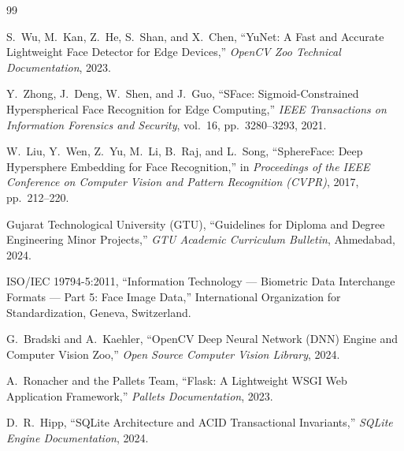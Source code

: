\documentclass[12pt,a4paper,oneside]{report}
\begin{document}
\clearpage
\begin{thebibliography}{99}

S.~Wu, M.~Kan, Z.~He, S.~Shan, and X.~Chen,
``YuNet: A Fast and Accurate Lightweight Face Detector for Edge Devices,''
\emph{OpenCV Zoo Technical Documentation}, 2023.

Y.~Zhong, J.~Deng, W.~Shen, and J.~Guo,
``SFace: Sigmoid-Constrained Hyperspherical Face Recognition for Edge Computing,''
\emph{IEEE Transactions on Information Forensics and Security}, vol.~16, pp.~3280--3293, 2021.

W.~Liu, Y.~Wen, Z.~Yu, M.~Li, B.~Raj, and L.~Song,
``SphereFace: Deep Hypersphere Embedding for Face Recognition,''
in \emph{Proceedings of the IEEE Conference on Computer Vision and Pattern Recognition (CVPR)}, 2017, pp.~212--220.

Gujarat Technological University (GTU),
``Guidelines for Diploma and Degree Engineering Minor Projects,''
\emph{GTU Academic Curriculum Bulletin}, Ahmedabad, 2024.

ISO/IEC 19794-5:2011,
``Information Technology --- Biometric Data Interchange Formats --- Part 5: Face Image Data,''
International Organization for Standardization, Geneva, Switzerland.

G.~Bradski and A.~Kaehler,
``OpenCV Deep Neural Network (DNN) Engine and Computer Vision Zoo,''
\emph{Open Source Computer Vision Library}, 2024.

A.~Ronacher and the Pallets Team,
``Flask: A Lightweight WSGI Web Application Framework,''
\emph{Pallets Documentation}, 2023.

D.~R.~Hipp,
``SQLite Architecture and ACID Transactional Invariants,''
\emph{SQLite Engine Documentation}, 2024.

\end{thebibliography}
\end{document}
